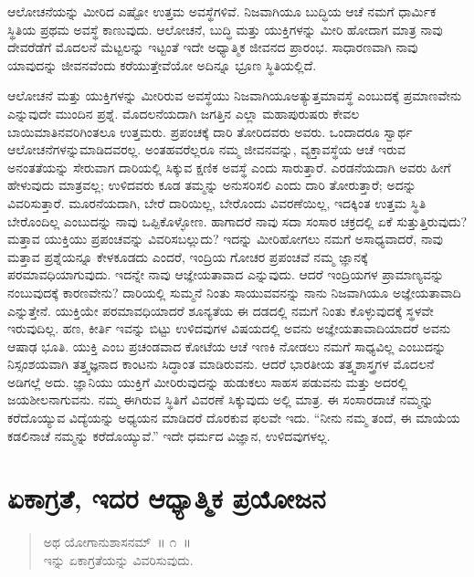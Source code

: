 \vskip 5pt

ಆಲೋಚನೆಯನ್ನು ಮೀರಿದ ಎಷ್ಟೋ ಉತ್ತಮ ಅವಸ್ಥೆಗಳಿವೆ. ನಿಜವಾಗಿಯೂ ಬುದ್ಧಿಯ ಆಚೆ ನಮಗೆ ಧಾರ್ಮಿಕ ಸ್ಥಿತಿಯ ಪ್ರಥಮ ಅವಸ್ಥೆ ಕಾಣುವುದು. ಆಲೋಚನೆ, ಬುದ್ಧಿ ಮತ್ತು ಯುಕ್ತಿಗಳನ್ನು ಮೀರಿ ಹೋದಾಗ ಮಾತ್ರ ನಾವು ದೇವರೆಡೆಗೆ ಮೊದಲನೆ ಮೆಟ್ಟಲನ್ನು ಇಟ್ಟಂತೆ ಇದೇ ಅಧ್ಯಾತ್ಮಿಕ ಜೀವನದ ಪ್ರಾರಂಭ. ಸಾಧಾರಣವಾಗಿ ನಾವು ಯಾವುದನ್ನು ಜೀವನವೆಂದು ಕರೆಯುತ್ತೇವೆಯೋ ಅದಿನ್ನೂ ಭ್ರೂಣ ಸ್ಥಿತಿಯಲ್ಲಿದೆ. 

\vskip 5pt

ಆಲೋಚನೆ ಮತ್ತು ಯುಕ್ತಿಗಳನ್ನು ಮೀರಿರುವ ಅವಸ್ಥೆಯು ನಿಜವಾಗಿಯೂ\break ಅತ್ಯುತ್ತಮಾವಸ್ಥೆ ಎಂಬುದಕ್ಕೆ ಪ್ರಮಾಣವೇನು ಎನ್ನುವುದೇ ಮುಂದಿನ ಪ್ರಶ್ನೆ. ಮೊದಲನೆಯದಾಗಿ ಜಗತ್ತಿನ ಎಲ್ಲಾ ಮಹಾಪುರುಷರು ಕೇವಲ ಬಾಯಿಮಾತಿನವರಿಗಿಂತಲೂ ಉತ್ತಮರು. ಪ್ರಪಂಚಕ್ಕೆ ದಾರಿ ತೋರಿದವರು ಅವರು. ಒಂದಾದರೂ ಸ್ವಾರ್ಥ ಆಲೋಚನೆಗಳನ್ನು\break ಮಾಡಿದವರಲ್ಲ. ಅಂತಹವರೆಲ್ಲರೂ ನಮ್ಮ ಜೀವನವನ್ನು, ವ್ಯಕ್ತಾವಸ್ಥೆಯ ಆಚೆ ಇರುವ ಅನಂತತೆಯನ್ನು ಸೇರುವಾಗ ದಾರಿಯಲ್ಲಿ ಸಿಕ್ಕುವ ಕ್ಷಣಿಕ ಅವಸ್ಥೆ ಎಂದು ಸಾರುತ್ತಾರೆ. ಎರಡನೆಯದಾಗಿ ಅವರು ಹೀಗೆ ಹೇಳುವುದು ಮಾತ್ರವಲ್ಲ; ಉಳಿದವರು ಕೂಡ ತಮ್ಮನ್ನು ಅನುಸರಿಸಲಿ ಎಂದು ದಾರಿ ತೋರುತ್ತಾರೆ; ಅದನ್ನು ವಿವರಿಸುತ್ತಾರೆ. ಮೂರನೆಯದಾಗಿ, ಬೇರೆ ದಾರಿಯಿಲ್ಲ, ಬೇರೊಂದು ವಿವರಣೆಯಿಲ್ಲ, ಇದಕ್ಕಿಂತ ಉತ್ತಮ ಸ್ಥಿತಿ ಬೇರೊಂದಿಲ್ಲ ಎಂಬುದನ್ನು ನಾವು ಒಪ್ಪಿಕೊಳ್ಳೋಣ. ಹಾಗಾದರೆ ನಾವು ಸದಾ ಸಂಸಾರ ಚಕ್ರದಲ್ಲಿ ಏಕೆ ಸುತ್ತುತ್ತಿರುವುದು? ಮತ್ತಾವ ಯುಕ್ತಿಯು ಪ್ರಪಂಚವನ್ನು ವಿವರಿಸಬಲ್ಲುದು? ಇದನ್ನು ಮೀರಿಹೋಗಲು ನಮಗೆ ಅಸಾಧ್ಯವಾದರೆ, ನಾವು ಮತ್ತಾವ ಪ್ರಶ್ನೆಯನ್ನೂ ಕೇಳಕೂಡದು ಎಂದರೆ, ಇಂದ್ರಿಯ ಗೋಚರ ಪ್ರಪಂಚವೆ ನಮ್ಮ ಜ್ಞಾನಕ್ಕೆ ಪರಮಾವಧಿಯಾಗುವುದು. ಇದನ್ನೇ ನಾವು ಆಜ್ಞೇಯತಾವಾದ ಎನ್ನುವುದು. ಆದರೆ ಇಂದ್ರಿಯಗಳ ಪ್ರಾಮಾಣ್ಯವನ್ನು ನಂಬುವುದಕ್ಕೆ ಕಾರಣವೇನು? ದಾರಿಯಲ್ಲಿ ಸುಮ್ಮನೆ ನಿಂತು ಸಾಯುವವನನ್ನು ನಾನು ನಿಜವಾಗಿಯೂ ಅಜ್ಞೇಯತಾವಾದಿ ಎನ್ನುತ್ತೇನೆ. ಯುಕ್ತಿಯೇ ಪರಮಾವಧಿಯಾದರೆ ಶೂನ್ಯತೆಯ ಈ ದಡದಲ್ಲಿ ನಮಗೆ ನಿಂತು ಕೊಳ್ಳುವುದಕ್ಕೆ ಸ್ಥಳವೇ ಇರುವುದಿಲ್ಲ. ಹಣ, ಕೀರ್ತಿ ಇವನ್ನು ಬಿಟ್ಟು ಉಳಿದವುಗಳ ವಿಷಯದಲ್ಲಿ ಅವನು ಅಜ್ಞೇಯತಾವಾದಿಯಾದರೆ ಅವನು ಆಷಾಢ ಭೂತಿ. ಯುಕ್ತಿ ಎಂಬ ಪ್ರಚಂಡವಾದ ಕೋಟೆಯ ಆಚೆ ಇಣಕಿ ನೋಡಲು ನಮಗೆ ಸಾಧ್ಯವಿಲ್ಲ ಎಂಬುದನ್ನು ನಿಸ್ಸಂಶಯವಾಗಿ ತತ್ತ್ವಜ್ಞನಾದ ಕಾಂಟನು ಸಿದ್ಧಾಂತ ಮಾಡಿರುವನು. ಆದರೆ ಭಾರತೀಯ ತತ್ತ್ವಶಾಸ್ತ್ರಗಳ ಮೊದಲನೆ ಅಡಿಗಲ್ಲೆ ಅದು. ಜ್ಞಾನಿಯು ಯುಕ್ತಿಗೆ ಮೀರಿರುವುದನ್ನು ಹುಡುಕಲು ಸಾಹಸ ಪಡುವನು ಮತ್ತು ಅದರಲ್ಲಿ ಜಯಶೀಲನಾಗುವನು. ನಮ್ಮ ಈಗಿರುವ ಸ್ಥಿತಿಗೆ ವಿವರಣೆ ಸಿಕ್ಕುವುದು ಅಲ್ಲಿ ಮಾತ್ರ. ಈ ಸಂಸಾರದಾಚೆ ನಮ್ಮನ್ನು ಕರೆದೊಯ್ಯುವ ವಿದ್ಯೆಯನ್ನು ಅಧ್ಯಯನ ಮಾಡಿದರೆ ದೊರಕುವ ಫಲವೇ ಇದು. “ನೀನು ನಮ್ಮ ತಂದೆ, ಈ ಮಾಯೆಯ ಕಡಲಿನಾಚೆ ನಮ್ಮನ್ನು ಕರೆದೊಯ್ಯುವೆ.” ಇದೇ ಧರ್ಮದ ವಿಜ್ಞಾನ, ಉಳಿದವುಗಳಲ್ಲ.

\chapter{ಏಕಾಗ್ರತೆ, ಇದರ ಆಧ್ಯಾತ್ಮಿಕ ಪ್ರಯೋಜನ}

\begin{verse}
ಅಥ ಯೋಗಾನುಶಾಸನಮ್​~॥ ೧~॥\\ಇನ್ನು ಏಕಾಗ್ರತೆಯನ್ನು ವಿವರಿಸುವುದು. 
\end{verse}

